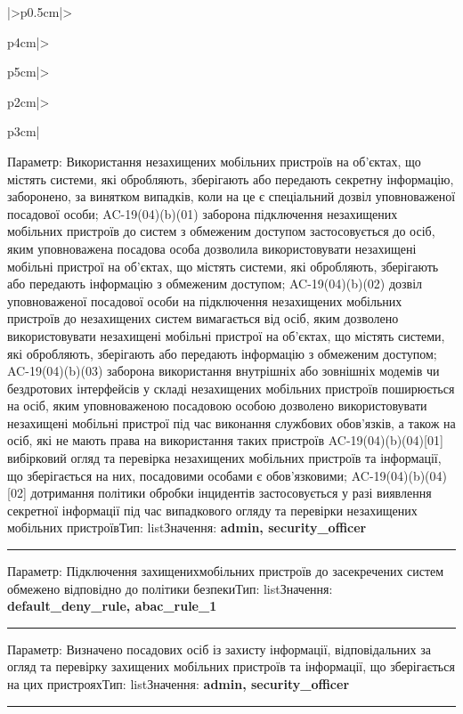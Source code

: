 \documentclass[10pt]{article}
\begin{document}
\begin{longtable}{|>{\centering\arraybackslash}p{0.5cm}|>{\raggedright\arraybackslash}p{4cm}|>{\raggedright\arraybackslash}p{5cm}|>{\raggedright\arraybackslash}p{2cm}|>{\raggedright\arraybackslash}p{3cm}|}
Параметр: Використання незахищених мобільних пристроїв на об'єктах, що містять системи, які обробляють, зберігають або передають секретну інформацію, заборонено, за винятком випадків, коли на це є спеціальний дозвіл уповноваженої посадової особи; AC-19(04)(b)(01) заборона підключення незахищених мобільних пристроїв до систем з обмеженим доступом застосовується до осіб, яким уповноважена посадова особа дозволила використовувати незахищені мобільні пристрої на об'єктах, що містять системи, які обробляють, зберігають або передають інформацію з обмеженим доступом; AC-19(04)(b)(02) дозвіл уповноваженої посадової особи на підключення незахищених мобільних пристроїв до незахищених систем вимагається від осіб, яким дозволено використовувати незахищені мобільні пристрої на об'єктах, що містять системи, які обробляють, зберігають або передають інформацію з обмеженим доступом; AC-19(04)(b)(03) заборона використання внутрішніх або зовнішніх модемів чи бездротових інтерфейсів у складі незахищених мобільних пристроїв поширюється на осіб, яким уповноваженою посадовою особою дозволено використовувати незахищені мобільні пристрої під час виконання службових обов'язків, а також на осіб, які не мають права на використання таких пристроїв AC-19(04)(b)(04)[01] вибірковий огляд та перевірка незахищених мобільних пристроїв та інформації, що зберігається на них, посадовими особами є обов'язковими; AC-19(04)(b)(04)[02] дотримання політики обробки інцидентів застосовується у разі виявлення секретної інформації під час випадкового огляду та перевірки незахищених мобільних пристроїв\newline Тип: list\newline Значення: \textbf{admin, security\_\allowbreak{}officer}\vspace{1mm}\newline\noindent\rule{\linewidth}{0.4pt}\vspace{1mm}
Параметр: Підключення захищенихмобільних пристроїв до засекречених систем обмежено відповідно до політики безпеки\newline Тип: list\newline Значення: \textbf{default\_\allowbreak{}deny\_\allowbreak{}rule, abac\_\allowbreak{}rule\_\allowbreak{}1}\vspace{1mm}\newline\noindent\rule{\linewidth}{0.4pt}\vspace{1mm}
Параметр: Визначено посадових осіб із захисту інформації, відповідальних за огляд та перевірку захищених мобільних пристроїв та інформації, що зберігається на цих пристроях\newline Тип: list\newline Значення: \textbf{admin, security\_\allowbreak{}officer}\vspace{1mm}\newline\noindent\rule{\linewidth}{0.4pt}\vspace{1mm}

\end{longtable}
\end{document}
